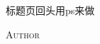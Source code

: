 \documentclass[9pt]{book}
\begin{document}
\pagestyle{mystyle}

\begin{titlepage}
    \vspace*{2cm}
    
    \noindent
    \vspace*{0.5cm}
    \Huge{标题页回头用ps来做}
    
    \vspace{1.5cm}
    { \textsc{Author}}
    \null\vfill
    \vspace*{1cm}
    \noindent
    \hfill
\end{titlepage}

\tableofcontents

\thispagestyle{empty}
\blankpage

\newpage
\setcounter{page}{1}



\end{document}
